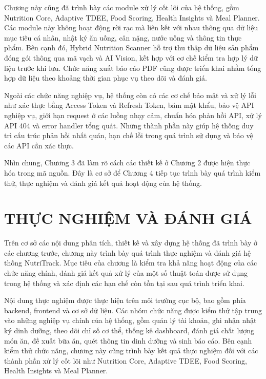 \documentclass[12pt, a4paper]{report}
\begin{document}
Chương này cũng đã trình bày các module xử lý cốt lõi của hệ thống, gồm Nutrition Core, Adaptive TDEE, Food Scoring, Health Insights và Meal Planner. Các module này không hoạt động rời rạc mà liên kết với nhau thông qua dữ liệu mục tiêu cá nhân, nhật ký ăn uống, cân nặng, nước uống và thông tin thực phẩm. Bên cạnh đó, Hybrid Nutrition Scanner hỗ trợ thu thập dữ liệu sản phẩm đóng gói thông qua mã vạch và AI Vision, kết hợp với cơ chế kiểm tra hợp lý dữ liệu trước khi lưu. Chức năng xuất báo cáo PDF cũng được triển khai nhằm tổng hợp dữ liệu theo khoảng thời gian phục vụ theo dõi và đánh giá.

Ngoài các chức năng nghiệp vụ, hệ thống còn có các cơ chế bảo mật và xử lý lỗi như xác thực bằng Access Token và Refresh Token, băm mật khẩu, bảo vệ API nghiệp vụ, giới hạn request ở các luồng nhạy cảm, chuẩn hóa phản hồi API, xử lý API 404 và error handler tổng quát. Những thành phần này giúp hệ thống duy trì cấu trúc phản hồi nhất quán, hạn chế lỗi trong quá trình sử dụng và bảo vệ các API cần xác thực.

Nhìn chung, Chương 3 đã làm rõ cách các thiết kế ở Chương 2 được hiện thực hóa trong mã nguồn. Đây là cơ sở để Chương 4 tiếp tục trình bày quá trình kiểm thử, thực nghiệm và đánh giá kết quả hoạt động của hệ thống.




\chapter{THỰC NGHIỆM VÀ ĐÁNH GIÁ}
Trên cơ sở các nội dung phân tích, thiết kế và xây dựng hệ thống đã trình bày ở các chương trước, chương này trình bày quá trình thực nghiệm và đánh giá hệ thống NutriTrack. Mục tiêu của chương là kiểm tra khả năng hoạt động của các chức năng chính, đánh giá kết quả xử lý của một số thuật toán được sử dụng trong hệ thống và xác định các hạn chế còn tồn tại sau quá trình triển khai.

Nội dung thực nghiệm được thực hiện trên môi trường cục bộ, bao gồm phía backend, frontend và cơ sở dữ liệu. Các nhóm chức năng được kiểm thử tập trung vào những nghiệp vụ chính của hệ thống, gồm quản lý tài khoản, ghi nhận nhật ký dinh dưỡng, theo dõi chỉ số cơ thể, thống kê dashboard, đánh giá chất lượng món ăn, đề xuất bữa ăn, quét thông tin dinh dưỡng và sinh báo cáo. Bên cạnh kiểm thử chức năng, chương này cũng trình bày kết quả thực nghiệm đối với các thành phần xử lý cốt lõi như Nutrition Core, Adaptive TDEE, Food Scoring, Health Insights và Meal Planner.
\end{document}
